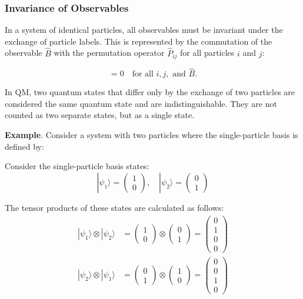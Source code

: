 \documentclass[12pt,a4paper]{report}
\newcommand{\esp}{\vspace{0.5cm}}
\begin{document}
	\subsubsection{Invariance of Observables}
	
	In a system of identical particles, all observables must be invariant under the exchange of particle labels. This is represented by the commutation of the observable $\hat{B}$ with the permutation operator $\hat{P}_{ij}$ for all particles $i$ and $j$:
	
	\begin{equation}
		[\hat{B}, \hat{P}_{ij}] = 0 \quad \text{for all } i, j, \text{ and } \hat{B}. \tag{2.51}
	\end{equation}
	
	In QM, two quantum states that differ only by the exchange of two particles are considered the same quantum state and are indistinguishable. They are not counted as two separate states, but as a single state.
	
	\esp
	
	\noindent \textbf{Example}. Consider a system with two particles where the single-particle basis is defined by:
	
	\esp
	
	\noindent Consider the single-particle basis states:
	\begin{equation*}
		|\psi_1\rangle = \begin{pmatrix} 1 \\ 0 \end{pmatrix}, \quad |\psi_2\rangle = \begin{pmatrix} 0 \\ 1 \end{pmatrix}
	\end{equation*}
	
	\noindent The tensor products of these states are calculated as follows:
	\begin{align*}
		|\psi_1\rangle \otimes |\psi_2\rangle &= \begin{pmatrix} 1 \\ 0 \end{pmatrix} \otimes \begin{pmatrix} 0 \\ 1 \end{pmatrix} = \begin{pmatrix} 0 \\ 1 \\ 0 \\ 0 \end{pmatrix} \\
		|\psi_2\rangle \otimes |\psi_1\rangle &= \begin{pmatrix} 0 \\ 1 \end{pmatrix} \otimes \begin{pmatrix} 1 \\ 0 \end{pmatrix} = \begin{pmatrix} 0 \\ 0 \\ 1 \\ 0 \end{pmatrix}
	\end{align*}
	
\end{document}
